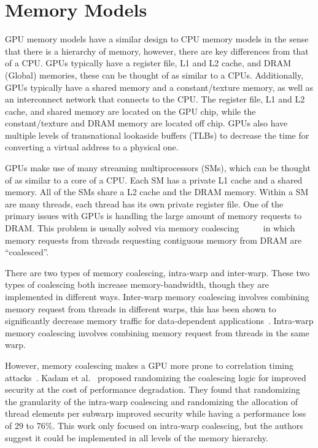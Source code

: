 \section{Memory Models}
GPU memory models have a similar design to CPU memory models in the sense that there is a hierarchy of memory, however, there are key differences from that of a CPU.
GPUs typically have a register file, L1 and L2 cache, and DRAM (Global) memories, these can be thought of as similar to a CPUs.
Additionally, GPUs typically have a shared memory and a constant/texture memory, as well as an interconnect network that connects to the CPU.
The register file, L1 and L2 cache, and shared memory are located on the GPU chip, while the constant/texture and DRAM memory are located off chip.
GPUs also have multiple levels of transnational lookaside buffers (TLBs) to decrease the time for converting a virtual address to a physical one.

GPUs make use of many streaming multiprocessors (SMs), which can be thought of as similar to a core of a CPU.
Each SM has a private L1 cache and a shared memory.
All of the SMs share a L2 cache and the DRAM memory.
Within a SM are many threads, each thread has its own private register file.
One of the primary issues with GPUs is handling the large amount of memory requests to DRAM.
This problem is usually solved via memory coalescing~\cite{Jog2013OWL}~\cite{Bakhoda2009}~\cite{Singh2013}~\cite{Fung2011HPC}~\cite{Kadam2018} in which memory requests from threads requesting contiguous memory from DRAM are ``coalesced''.

There are two types of memory coalescing, intra-warp and inter-warp.
These two types of coalescing both increase memory-bandwidth, though they are implemented in different ways.
Inter-warp memory coalescing involves combining memory request from threads in different warps, this has been shown to significantly decrease memory traffic for data-dependent applications~\cite{Bakhoda2009}.
Intra-warp memory coalescing involves combining memory request from threads in the same warp.

However, memory coalescing makes a GPU more prone to correlation timing attacks~\cite{Kadam2018}. Kadam et al.~\cite{Kadam2018} proposed randomizing the coalescing logic for improved security at the cost of performance degradation.
They found that randomizing the granularity of the intra-warp coalescing and randomizing the allocation of thread elements per subwarp improved security while having a performance loss of 29 to 76\%.
This work only focused on intra-warp coalescing, but the authors suggest it could be implemented in all levels of the memory hierarchy.

